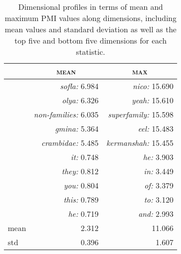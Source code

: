 \begin{table}
\centering
\begin{tabular}{lr|r}
\hline
& \multicolumn{1}{c}{\textsc{mean}} & \multicolumn{1}{c}{\textsc{max}} \\
\hline
\parbox[t]{2mm}{} & \emph{sofla:} 6.984 & \emph{nico:} 15.690 \\
& \emph{olya:} 6.326 & \emph{yeah:} 15.610 \\
& \emph{non-families:} 6.035 & \emph{superfamily:} 15.598 \\
& \emph{gmina:} 5.364 & \emph{eel:} 15.483 \\
& \emph{crambidae:} 5.485 & \emph{kermanshah:} 15.455 \\
\hline
\parbox[t]{2mm}{} & \emph{it:} 0.748 & \emph{he:} 3.903 \\
& \emph{they:} 0.812 & \emph{in:} 3.449 \\
& \emph{you:} 0.804 & \emph{of:} 3.379 \\
& \emph{this:} 0.789 & \emph{to:} 3.120 \\
& \emph{he:} 0.719 & \emph{and:} 2.993 \\
\hline
mean & 2.312 & 11.066 \\
std & 0.396 & 1.607 \\
\hline
\end{tabular}
\caption[Mean and Maximum PMI Values]{Dimensional profiles in terms of mean and maximum PMI values along dimensions, including mean values and standard deviation as well as the top five and bottom five dimensions for each statistic.}
\label{tab:profiles}
\end{table}

